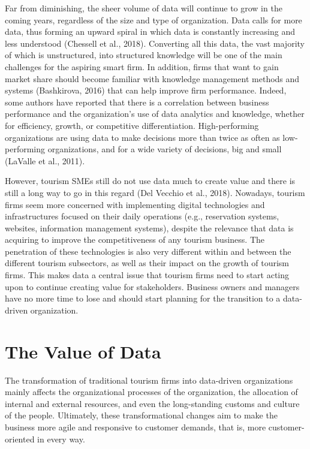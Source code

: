 \documentclass[
  letterpaper,
  DIV=11,
  numbers=noendperiod]{scrreprt}
\begin{document}
Far from diminishing, the sheer volume of data will continue to grow in
the coming years, regardless of the size and type of organization. Data
calls for more data, thus forming an upward spiral in which data is
constantly increasing and less understood (Chessell et al., 2018).
Converting all this data, the vast majority of which is unstructured,
into structured knowledge will be one of the main challenges for the
aspiring smart firm. In addition, firms that want to gain market share
should become familiar with knowledge management methods and systems
(Bashkirova, 2016) that can help improve firm performance. Indeed, some
authors have reported that there is a correlation between business
performance and the organization's use of data analytics and knowledge,
whether for efficiency, growth, or competitive differentiation.
High-performing organizations are using data to make decisions more than
twice as often as low-performing organizations, and for a wide variety
of decisions, big and small (LaValle et al., 2011).

However, tourism SMEs still do not use data much to create value and
there is still a long way to go in this regard (Del Vecchio et al.,
2018). Nowadays, tourism firms seem more concerned with implementing
digital technologies and infrastructures focused on their daily
operations (e.g., reservation systems, websites, information management
systems), despite the relevance that data is acquiring to improve the
competitiveness of any tourism business. The penetration of these
technologies is also very different within and between the different
tourism subsectors, as well as their impact on the growth of tourism
firms. This makes data a central issue that tourism firms need to start
acting upon to continue creating value for stakeholders. Business owners
and managers have no more time to lose and should start planning for the
transition to a data-driven organization.

\hypertarget{the-value-of-data}{%
\section{The Value of Data}\label{the-value-of-data}}

The transformation of traditional tourism firms into data-driven
organizations mainly affects the organizational processes of the
organization, the allocation of internal and external resources, and
even the long-standing customs and culture of the people. Ultimately,
these transformational changes aim to make the business more agile and
responsive to customer demands, that is, more customer-oriented in every
way.
\end{document}
